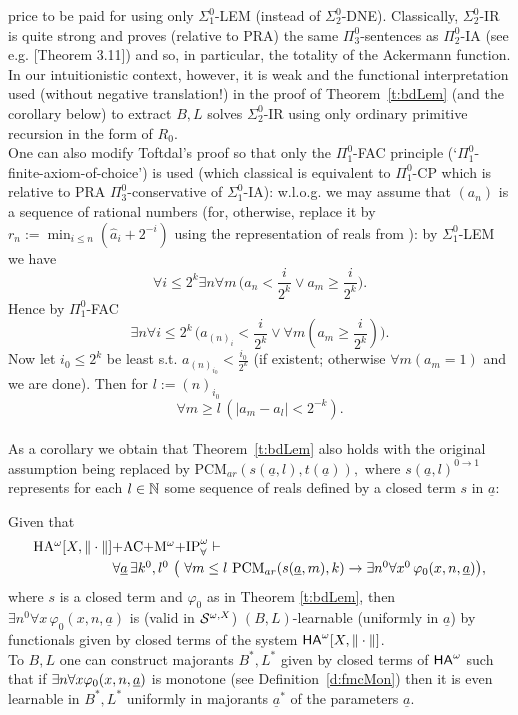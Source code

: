 price to be paid for using only $\Sigma^0_1$-LEM (instead of 
$\Sigma^0_2$-DNE). Classically, $\Sigma^0_2$-IR is quite strong and proves 
(relative to PRA) the same $\Pi^0_3$-sentences as $\Pi^0_2$-IA 
(see e.g. \cite{Sieg}[Theorem 3.11]) and so, 
in particular, the totality of the Ackermann function. In our intuitionistic 
context, however, it is weak and the functional interpretation used 
(without negative translation!) in the 
proof of Theorem~\ref{t:bdLem} (and the corollary below) to extract $B,L$ solves 
$\Sigma^0_2$-IR using only ordinary primitive recursion in the form of 
$R_0.$ \\ One can also modify Toftdal's proof so that only the $\Pi^0_1$-FAC 
principle (`$\Pi^0_1$-finite-axiom-of-choice') is used (which classical 
is equivalent to $\Pi^0_1$-CP which is relative to PRA $\Pi^0_3$-conservative 
of $\Sigma^0_1$-IA): w.l.o.g. we may assume that $(a_n)$ is a sequence 
of rational numbers (for, otherwise, replace it by $r_n:=\min_{i\le n} 
(\widehat{a}_i+2^{-i})$ using the representation of reals from 
\cite{Kohlenbach08}): 
by $\Sigma^0_1$-LEM we have 
\[ \forall i\le 2^{k}\exists n\forall m \,\big( a_n<\frac{i}{2^k} \vee 
a_m\ge \frac{i}{2^k}\big). \] 
Hence by $\Pi^0_1$-FAC 
\[ \exists n\forall i\le 2^k \,\big(a_{(n)_i} <\frac{i}{2^k}\vee 
\forall m (a_m\ge \frac{i}{2^k})\big). \] 
Now let $i_0\le 2^k$ be least s.t. $ a_{(n)_{i_0}} <\frac{i_0}{2^k}$ 
(if existent; otherwise $\forall m (a_m=1)$ and we are done). Then for 
$l:=(n)_{i_0}$ 
\[ \forall m\ge l \, (|a_m-a_l|<2^{-k}). \]   
\\[2mm]
As a corollary we obtain that Theorem~\ref{t:bdLem} also holds with 
the original assumption being replaced by 
PCM$_{ar}(s(\underline{a},l),t(\underline{a})),$ where 
$s(\underline{a},l)^{0\to 1}$ represents for each $l\in\NN$ 
some sequence of reals defined by 
a closed term $s$ in $\underline{a}:$
\begin{cor} \label{cor.2.11}
Given that 
\[\ba{l} \mbox{\rm HA$^{\omega}[X,\|\cdot\|]+$AC$+$M$^{\omega}+
$IP}^{\omega}_{\forall}\vdash \\[1mm] \hspace*{2cm}  
\forall \underline{a}\,\exists k^0 ,l^0\ \big( 
\ \forall m \le l\ \mbox{\rm PCM}_{ar}(s(\underline{a},m),k)
 \rightarrow \exists n^0\forall x^0\,\varphi_0(x,n,\underline{a})\big), 
\ea \] 
where $s$ is a closed term and $\varphi_0$ as in Theorem \ref{t:bdLem}, then 
$\exists n^0\forall x\,\varphi_0(x,n,\underline{a})$ 
is (valid in ${\cal S}^{\omega,X}$) 
$(B,L)$-learnable (uniformly in $\underline{a}$) by functionals given by 
closed terms of the system $\ha[X,\|\cdot\|]$.\\
To $B,L$ one can construct majorants 
$B^*,L^*$ given by closed terms of $\ha$ such that 
if $\exists n\forall x \phi_0(x,n,\tup a)$ is monotone (see Definition~\ref{d:fmcMon}) then it is even learnable in $B^*,L^*$ uniformly in
majorants $\underline{a}^*$ of the parameters $\underline{a}$.
\end{cor}   
